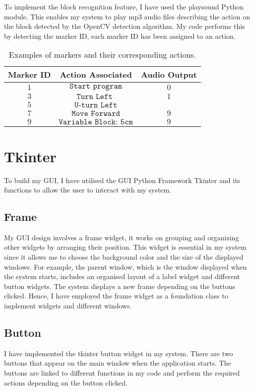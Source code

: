\documentclass[oneside,%
                    author={Malak Hajji},
                    degree={BSc},
                    title={Designing An Accessible Computational Toolkit For Students},
                  subtitle={With Mixed Visual Abilities}]{dissertation}
\begin{document}
To implement the block recognition feature, I have used the playsound Python module. This enables my system to play mp3 audio files describing the action on the block detected by the OpenCV detection algorithm. My code performs this by detecting the marker ID, each marker ID has been assigned to an action. 
\begin{table}[t]
\centering
\begin{tabular}{|cc|c|}
\hline
Marker ID      & Action Associated      & Audio Output      \\
\hline
$1     $ & $\texttt{Start program} $ & $0     $ \\
$3     $ & $\texttt{Turn Left     }$ & $1     $ \\
$5     $ & $\texttt{U-turn Left}   $ & $  $\\
$7     $ & $\texttt{Move Forward}  $ & $9     $ \\
$9     $ & $\texttt{Variable Block: 5cm}  $ & $9     $ \\
\hline
\end{tabular}
\caption{Examples of markers and their corresponding actions.}
\label{tab}
\end{table}

\section{Tkinter}

To build my GUI, I have utilised the GUI Python Framework Tkinter and its functions to allow the user to interact with my system.

\subsection{Frame}
My GUI design involves a frame widget, it works on grouping and organizing other widgets by arranging their position. This widget is essential in my system since it allows me to choose the background color and the size of the displayed windows. For example, the parent window, which is the window displayed when the system starts, includes an organised layout of a label widget and different button widgets. The system displays a new frame depending on the buttons clicked. Hence, I have employed the frame widget as a foundation class to implement widgets and different windows.

\subsection{Button}
I have implemented the tkinter button widget in my system. There are two buttons that appear on the main window when the application starts. The buttons are linked to different functions in my code and perform the required actions depending on the button clicked.
\end{document}
